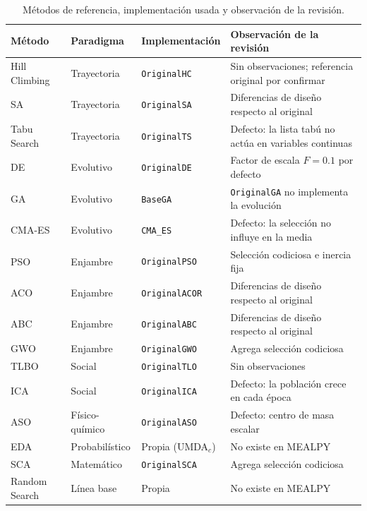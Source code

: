 \documentclass[11pt,letterpaper]{article}
\begin{document}
\begin{table}[H]
\centering
\caption{Métodos de referencia, implementación usada y observación de la revisión.}
\label{tab:metodos}
\small
\begin{tabularx}{\textwidth}{@{}lL{2.4cm}L{2.7cm}X@{}}
\toprule
Método & Paradigma & Implementación & Observación de la revisión \\
\midrule
Hill Climbing & Trayectoria & \texttt{OriginalHC} & Sin observaciones; referencia original por confirmar \\
SA~\cite{kirkpatrick1983} & Trayectoria & \texttt{OriginalSA} & Diferencias de diseño respecto al original \\
Tabu Search~\cite{glover1989} & Trayectoria & \texttt{OriginalTS} & Defecto: la lista tabú no actúa en variables continuas \\
DE~\cite{storn1997} & Evolutivo & \texttt{OriginalDE} & Factor de escala $F=0.1$ por defecto \\
GA~\cite{holland1975} & Evolutivo & \texttt{BaseGA} & \texttt{OriginalGA} no implementa la evolución \\
CMA-ES~\cite{hansen2001} & Evolutivo & \texttt{CMA\_ES} & Defecto: la selección no influye en la media \\
PSO~\cite{kennedy1995} & Enjambre & \texttt{OriginalPSO} & Selección codiciosa e inercia fija \\
ACO~\cite{socha2008} & Enjambre & \texttt{OriginalACOR} & Diferencias de diseño respecto al original \\
ABC~\cite{karaboga2007} & Enjambre & \texttt{OriginalABC} & Diferencias de diseño respecto al original \\
GWO~\cite{mirjalili2014} & Enjambre & \texttt{OriginalGWO} & Agrega selección codiciosa \\
TLBO~\cite{rao2011} & Social & \texttt{OriginalTLO} & Sin observaciones \\
ICA~\cite{atashpaz2007} & Social & \texttt{OriginalICA} & Defecto: la población crece en cada época \\
ASO~\cite{zhao2019} & Físico-químico & \texttt{OriginalASO} & Defecto: centro de masa escalar \\
EDA~\cite{larranaga2002} & Probabilístico & Propia (UMDA$_c$) & No existe en MEALPY \\
SCA~\cite{mirjalili2016} & Matemático & \texttt{OriginalSCA} & Agrega selección codiciosa \\
\midrule
Random Search & Línea base & Propia & No existe en MEALPY \\
\bottomrule
\end{tabularx}
\end{table}
\end{document}
